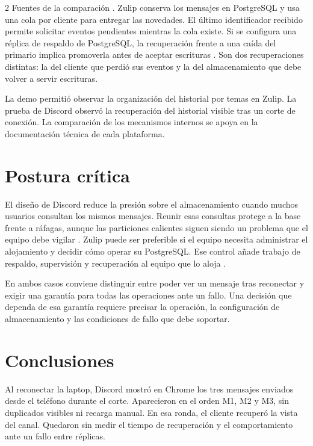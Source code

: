 \documentclass[11pt,a4paper]{article}
\begin{document}
\begin{multicols}{2}
Fuentes de la comparación
\cite{ingram2023messages,discordGateway,smith2023authOutage,zulipArchitecture,zulipSendingMessages,zulipPostgresql,zulipEvents}.
Zulip conserva los mensajes en PostgreSQL y usa una cola por cliente
para entregar las novedades. El último identificador recibido permite
solicitar eventos pendientes mientras la cola existe. Si se configura
una réplica de respaldo de PostgreSQL, la recuperación frente a una
caída del primario implica promoverla antes de aceptar escrituras
\cite{zulipEvents,zulipPostgresql}. Son dos recuperaciones distintas:
la del cliente que perdió sus eventos y la del almacenamiento que
debe volver a servir escrituras.

La demo permitió observar la organización del historial por temas en
Zulip. La prueba de Discord observó la recuperación del historial
visible tras un corte de conexión. La comparación de los mecanismos
internos se apoya en la documentación técnica de cada plataforma.
\section{Postura crítica}
El diseño de Discord reduce la presión sobre el almacenamiento cuando
muchos usuarios consultan los mismos mensajes. Reunir esas consultas
protege a la base frente a ráfagas, aunque las particiones calientes
siguen siendo un problema que el equipo debe vigilar
\cite{ingram2023messages}. Zulip puede ser preferible si el equipo
necesita administrar el alojamiento y decidir cómo operar su
PostgreSQL. Ese control añade trabajo de respaldo, supervisión y
recuperación al equipo que lo aloja
\cite{abbott2026zulip,zulipPostgresql}.

En ambos casos conviene distinguir entre poder ver un mensaje tras
reconectar y exigir una garantía para todas las operaciones ante un
fallo. Una decisión que dependa de esa garantía requiere precisar la
operación, la configuración de almacenamiento y las condiciones de
fallo que debe soportar.

\section{Conclusiones}
Al reconectar la laptop, Discord mostró en Chrome los tres mensajes
enviados desde el teléfono durante el corte. Aparecieron en el orden
M1, M2 y M3, sin duplicados visibles ni recarga manual. En esa ronda,
el cliente recuperó la vista del canal. Quedaron sin medir el tiempo
de recuperación y el comportamiento ante un fallo entre réplicas.


\end{multicols}
\end{document}
